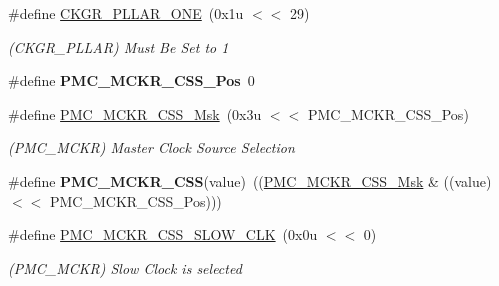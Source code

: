 \begin{DoxyCompactItemize}
\item 
\mbox{\label{group__SAMV71__PMC_gaed80bc1a380b51a350df524311967a3e}} 
\#define \mbox{\hyperlink{group__SAMV71__PMC_gaed80bc1a380b51a350df524311967a3e}{C\+K\+G\+R\+\_\+\+P\+L\+L\+A\+R\+\_\+\+O\+NE}}~(0x1u $<$$<$ 29)
\begin{DoxyCompactList}\small\item\em (C\+K\+G\+R\+\_\+\+P\+L\+L\+AR) Must Be Set to 1 \end{DoxyCompactList}\item 
\mbox{\label{group__SAMV71__PMC_gade7a71e6c8aabb95838f2d0f08f1a4f1}} 
\#define {\bfseries P\+M\+C\+\_\+\+M\+C\+K\+R\+\_\+\+C\+S\+S\+\_\+\+Pos}~0
\item 
\mbox{\label{group__SAMV71__PMC_gaf5490e2702410b788902efcf7fc1876c}} 
\#define \mbox{\hyperlink{group__SAMV71__PMC_gaf5490e2702410b788902efcf7fc1876c}{P\+M\+C\+\_\+\+M\+C\+K\+R\+\_\+\+C\+S\+S\+\_\+\+Msk}}~(0x3u $<$$<$ P\+M\+C\+\_\+\+M\+C\+K\+R\+\_\+\+C\+S\+S\+\_\+\+Pos)
\begin{DoxyCompactList}\small\item\em (P\+M\+C\+\_\+\+M\+C\+KR) Master Clock Source Selection \end{DoxyCompactList}\item 
\mbox{\label{group__SAMV71__PMC_gae0133d836d62b17a81ee91155861817d}} 
\#define {\bfseries P\+M\+C\+\_\+\+M\+C\+K\+R\+\_\+\+C\+SS}(value)~((\mbox{\hyperlink{group__SAMV71__PMC_gaf5490e2702410b788902efcf7fc1876c}{P\+M\+C\+\_\+\+M\+C\+K\+R\+\_\+\+C\+S\+S\+\_\+\+Msk}} \& ((value) $<$$<$ P\+M\+C\+\_\+\+M\+C\+K\+R\+\_\+\+C\+S\+S\+\_\+\+Pos)))
\item 
\mbox{\label{group__SAMV71__PMC_gac30f30d82aa0a8e6ffd94e278d561b84}} 
\#define \mbox{\hyperlink{group__SAMV71__PMC_gac30f30d82aa0a8e6ffd94e278d561b84}{P\+M\+C\+\_\+\+M\+C\+K\+R\+\_\+\+C\+S\+S\+\_\+\+S\+L\+O\+W\+\_\+\+C\+LK}}~(0x0u $<$$<$ 0)
\begin{DoxyCompactList}\small\item\em (P\+M\+C\+\_\+\+M\+C\+KR) Slow Clock is selected \end{DoxyCompactList}\item 
\mbox{\label{group__SAMV71__PMC_ga1083253fbc37fcfcc9aa078dbc35f067}} 

\end{DoxyCompactItemize}

